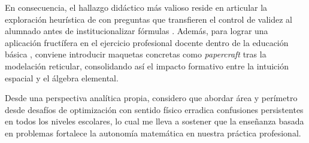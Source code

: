 \documentclass[spanish,letterpaper,oneside]{article}
\begin{document}
En consecuencia, el hallazgo didáctico más valioso reside en articular la exploración heurística de \citet{polya1945} con preguntas que transfieren el control de validez al alumnado antes de institucionalizar fórmulas \citep{vandewalle2019}. Además, para lograr una aplicación fructífera en el ejercicio profesional docente dentro de la educación básica \citep{sep2023_fase5}, conviene introducir maquetas concretas como \textit{papercraft} tras la modelación reticular, consolidando así el impacto formativo entre la intuición espacial y el álgebra elemental.

Desde una perspectiva analítica propia, considero que abordar área y perímetro desde desafíos de optimización con sentido físico erradica confusiones persistentes en todos los niveles escolares, lo cual me lleva a sostener que la enseñanza basada en problemas fortalece la autonomía matemática en nuestra práctica profesional.

\newsavebox{\hiddenbibbox}
\begin{lrbox}{\hiddenbibbox}\begin{minipage}{\textwidth}\end{minipage}\end{lrbox}
\end{document}

